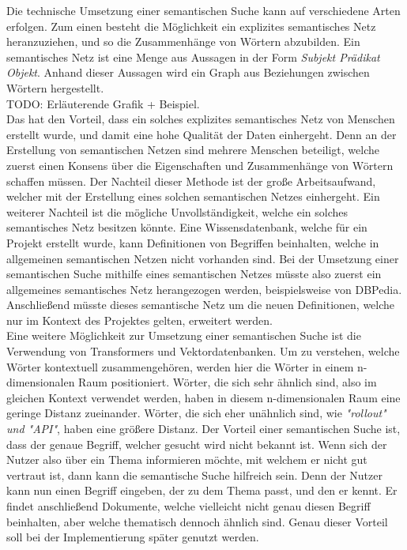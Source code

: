 Die technische Umsetzung einer semantischen Suche kann auf verschiedene Arten erfolgen.
Zum einen besteht die Möglichkeit ein explizites semantisches Netz heranzuziehen, und so die Zusammenhänge von Wörtern abzubilden.
Ein semantisches Netz ist eine Menge aus Aussagen in der Form \textit{Subjekt Prädikat Objekt}.
Anhand dieser Aussagen wird ein Graph aus Beziehungen zwischen Wörtern hergestellt.\cite{Lehmann}\\

TODO: Erläuterende Grafik + Beispiel.\\

Das hat den Vorteil, dass ein solches explizites semantisches Netz von Menschen erstellt wurde, und damit eine hohe Qualität der Daten einhergeht.
Denn an der Erstellung von semantischen Netzen sind mehrere Menschen beteiligt, welche zuerst einen Konsens über die Eigenschaften und Zusammenhänge von Wörtern schaffen müssen.
Der Nachteil dieser Methode ist der große Arbeitsaufwand, welcher mit der Erstellung eines solchen semantischen Netzes einhergeht.
Ein weiterer Nachteil ist die mögliche Unvollständigkeit, welche ein solches semantisches Netz besitzen könnte.
Eine Wissensdatenbank, welche für ein Projekt erstellt wurde, kann Definitionen von Begriffen beinhalten, welche in allgemeinen semantischen Netzen nicht vorhanden sind.
Bei der Umsetzung einer semantischen Suche mithilfe eines semantischen Netzes müsste also zuerst ein allgemeines semantisches Netz herangezogen werden, beispielsweise von DBPedia.
Anschließend müsste dieses semantische Netz um die neuen Definitionen, welche nur im Kontext des Projektes gelten, erweitert werden.\\

Eine weitere Möglichkeit zur Umsetzung einer semantischen Suche ist die Verwendung von Transformers und Vektordatenbanken.
Um zu verstehen, welche Wörter kontextuell zusammengehören, werden hier die Wörter in einem n-dimensionalen Raum positioniert.
Wörter, die sich sehr ähnlich sind, also im gleichen Kontext verwendet werden, haben in diesem n-dimensionalen Raum eine geringe Distanz zueinander.
Wörter, die sich eher unähnlich sind, wie \textit{"rollout" und "API"}, haben eine größere Distanz.
Der Vorteil einer semantischen Suche ist, dass der genaue Begriff, welcher gesucht wird nicht bekannt ist.
Wenn sich der Nutzer also über ein Thema informieren möchte, mit welchem er nicht gut vertraut ist, dann kann die semantische Suche hilfreich sein.
Denn der Nutzer kann nun einen Begriff eingeben, der zu dem Thema passt, und den er kennt.
Er findet anschließend Dokumente, welche vielleicht nicht genau diesen Begriff beinhalten, aber welche thematisch dennoch ähnlich sind.
Genau dieser Vorteil soll bei der Implementierung später genutzt werden.\\

